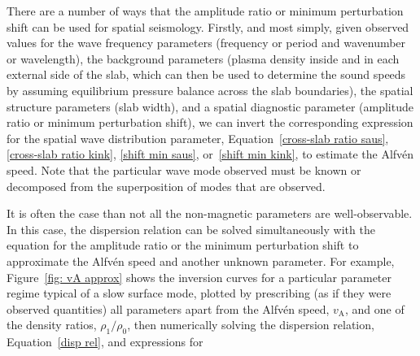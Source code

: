 \documentclass[namedreferences]{solarphysics}
\numberwithin{equation}{section}
\begin{document}
\begin{article}
There are a number of ways that the amplitude ratio or minimum perturbation shift can be used for spatial seismology. Firstly, and most simply, given observed values for the wave frequency parameters (frequency or period and wavenumber or wavelength), the background parameters (plasma density inside and in each external side of the slab, which can then be used to determine the sound speeds by assuming equilibrium pressure balance across the slab boundaries), the spatial structure parameters (slab width), and a spatial diagnostic parameter (amplitude ratio or minimum perturbation shift), we can invert the corresponding expression for the spatial wave distribution parameter, Equation~\eqref{cross-slab ratio saus}, \eqref{cross-slab ratio kink}, \eqref{shift min saus}, or~\eqref{shift min kink}, to estimate the Alfv\'{e}n speed. Note that the particular wave mode observed must be known or decomposed from the superposition of modes that are observed.

It is often the case than not all the non-magnetic parameters are well-observable. In this case, the dispersion relation can be solved simultaneously with the equation for the amplitude ratio or the minimum perturbation shift to approximate the Alfv\'{e}n speed and another unknown parameter. For example, Figure~\ref{fig: vA approx} shows the inversion curves for a particular parameter regime typical of a slow surface mode, plotted by prescribing (as if they were observed quantities) all parameters apart from the Alfv\'{e}n speed, $v_\textrm{A}$, and one of the density ratios, $\rho_1/\rho_0$, then numerically solving the dispersion relation, Equation~\eqref{disp rel}, and expressions for 


\end{article}
\end{document}
